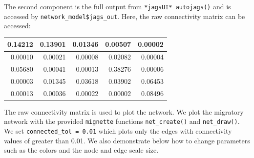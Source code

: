 \documentclass[
]{book}
\newenvironment{Shaded}{\begin{snugshade}}{\end{snugshade}}
\newcommand{\NormalTok}[1]{#1}
\newcommand{\OtherTok}[1]{\textcolor[rgb]{0.56,0.35,0.01}{#1}}
\newcommand{\SpecialCharTok}[1]{\textcolor[rgb]{0.81,0.36,0.00}{\textbf{#1}}}
\begin{document}
The second component is the full output from \href{https://rdrr.io/cran/jagsUI/man/autojags.html}{\texttt{*jagsUI*\ autojags()}} and is accessed by \texttt{network\_model\$jags\_out}. Here, the raw connectivity matrix can be accessed:

\begin{Shaded}
\end{Shaded}

\begin{tabular}{r|r|r|r|r}
\hline
0.14212 & 0.13901 & 0.01346 & 0.00507 & 0.00002\\
\hline
0.00010 & 0.00021 & 0.00008 & 0.02082 & 0.00004\\
\hline
0.05680 & 0.00041 & 0.00013 & 0.38276 & 0.00006\\
\hline
0.00003 & 0.01345 & 0.03618 & 0.03902 & 0.06453\\
\hline
0.00013 & 0.00036 & 0.00022 & 0.00002 & 0.08496\\
\hline
\end{tabular}

The raw connectivity matrix is used to plot the network. We plot the migratory network with the provided \texttt{mignette} functions \texttt{net\_create()} and \texttt{net\_draw()}. We set \texttt{connected\_tol\ =\ 0.01} which plots only the edges with connectivity values of greater than 0.01. We also demonstrate below how to change parameters such as the colors and the node and edge scale size.
\end{document}
